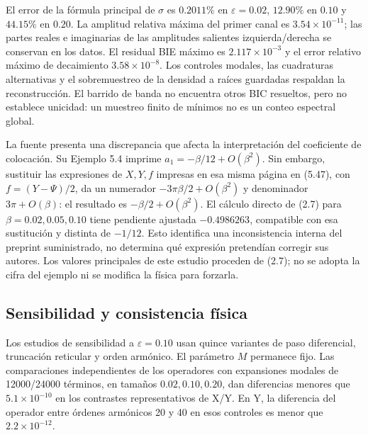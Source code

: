 \documentclass[11pt]{article}
\newcommand{\eps}{\varepsilon}
\begin{document}
El error de la fórmula principal de $\sigma$ es $0.2011\%$ en $\eps=0.02$, $12.90\%$ en $0.10$ y $44.15\%$ en $0.20$. La amplitud relativa máxima del primer canal es $3.54\times10^{-11}$; las partes reales e imaginarias de las amplitudes salientes izquierda/derecha se conservan en los datos. El residual BIE máximo es $2.117\times10^{-3}$ y el error relativo máximo de decaimiento $3.58\times10^{-8}$. Los controles modales, las cuadraturas alternativas y el sobremuestreo de la densidad a raíces guardadas respaldan la reconstrucción. El barrido de banda no encuentra otros BIC resueltos, pero no establece unicidad: un muestreo finito de mínimos no es un conteo espectral global.

La fuente presenta una discrepancia que afecta la interpretación del coeficiente de colocación. Su Ejemplo 5.4 imprime $a_1=-\beta/12+O(\beta^2)$. Sin embargo, sustituir las expresiones de $X,Y,f$ impresas en esa misma página en (5.47), con $f=(Y-\Psi)/2$, da un numerador $-3\pi\beta/2+O(\beta^2)$ y denominador $3\pi+O(\beta)$: el resultado es $-\beta/2+O(\beta^2)$. El cálculo directo de (2.7) para $\beta=0.02,0.05,0.10$ tiene pendiente ajustada $-0.4986263$, compatible con esa sustitución y distinta de $-1/12$. Esto identifica una inconsistencia interna del preprint suministrado, no determina qué expresión pretendían corregir sus autores. Los valores principales de este estudio proceden de (2.7); no se adopta la cifra del ejemplo ni se modifica la física para forzarla.

\subsection{Sensibilidad y consistencia física}
Los estudios de sensibilidad a $\eps=0.10$ usan quince variantes de paso diferencial, truncación reticular y orden armónico. El parámetro $M$ permanece fijo. Las comparaciones independientes de los operadores con expansiones modales de 12000/24000 términos, en tamaños $0.02,0.10,0.20$, dan diferencias menores que $5.1\times10^{-10}$ en los contrastes representativos de X/Y. En Y, la diferencia del operador entre órdenes armónicos 20 y 40 en esos controles es menor que $2.2\times10^{-12}$.
\end{document}
